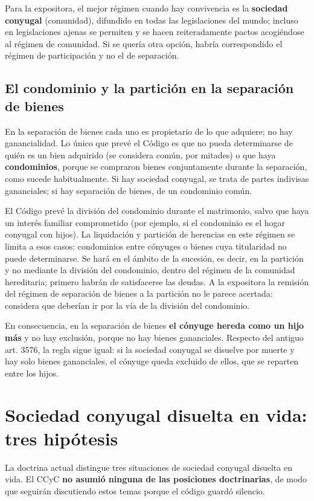 \documentclass[12pt,oneside]{book}
\begin{document}
Para la expositora, el mejor régimen cuando hay convivencia es la \textbf{sociedad conyugal} (comunidad), difundido en todas las legislaciones del mundo; incluso en legislaciones ajenas se permiten y se hacen reiteradamente pactos acogiéndose al régimen de comunidad. Si se quería otra opción, habría correspondido el régimen de participación y no el de separación.

\subsection{El condominio y la partición en la separación de bienes}

En la separación de bienes cada uno es propietario de lo que adquiere; no hay ganancialidad. Lo único que prevé el Código es que no pueda determinarse de quién es un bien adquirido (se considera común, por mitades) o que haya \textbf{condominios}, porque se compraron bienes conjuntamente durante la separación, como sucede habitualmente. Si hay sociedad conyugal, se trata de partes indivisas gananciales; si hay separación de bienes, de un condominio común.

El Código prevé la división del condominio durante el matrimonio, salvo que haya un interés familiar comprometido (por ejemplo, si el condominio es el hogar conyugal con hijos). La liquidación y partición de herencias en este régimen se limita a esos casos: condominios entre cónyuges o bienes cuya titularidad no puede determinarse. Se hará en el ámbito de la sucesión, es decir, en la partición y no mediante la división del condominio, dentro del régimen de la comunidad hereditaria; primero habrán de satisfacerse las deudas. A la expositora la remisión del régimen de separación de bienes a la partición no le parece acertada: considera que deberían ir por la vía de la división del condominio.

En consecuencia, en la separación de bienes \textbf{el cónyuge hereda como un hijo más} y no hay exclusión, porque no hay bienes gananciales. Respecto del antiguo art. 3576, la regla sigue igual: si la sociedad conyugal se disuelve por muerte y hay solo bienes gananciales, el cónyuge queda excluido de ellos, que se reparten entre los hijos.

\section{Sociedad conyugal disuelta en vida: tres hipótesis}

La doctrina actual distingue tres situaciones de sociedad conyugal disuelta en vida. El CCyC \textbf{no asumió ninguna de las posiciones doctrinarias}, de modo que seguirán discutiendo estos temas porque el código guardó silencio.
\end{document}
